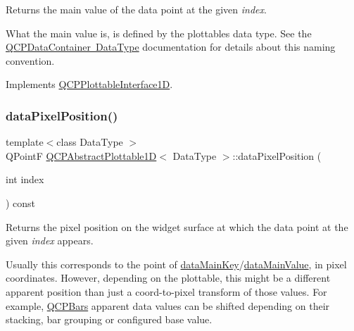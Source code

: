 Returns the main value of the data point at the given {\itshape index}.

What the main value is, is defined by the plottable\textquotesingle{}s data type. See the \mbox{\hyperlink{class_q_c_p_data_container_qcpdatacontainer-datatype}{Q\+C\+P\+Data\+Container Data\+Type}} documentation for details about this naming convention. 

Implements \mbox{\hyperlink{class_q_c_p_plottable_interface1_d_af6330919e8023277d08c958a6074fc76}{Q\+C\+P\+Plottable\+Interface1D}}.

\mbox{\label{class_q_c_p_abstract_plottable1_d_a14cf167457cda163575e6eec2a0b178d}} 
\subsubsection{\texorpdfstring{data\+Pixel\+Position()}{dataPixelPosition()}}
{\footnotesize\ttfamily template$<$class Data\+Type $>$ \\
Q\+PointF \mbox{\hyperlink{class_q_c_p_abstract_plottable1_d}{Q\+C\+P\+Abstract\+Plottable1D}}$<$ Data\+Type $>$\+::data\+Pixel\+Position (\begin{DoxyParamCaption}\item[{int}]{index }\end{DoxyParamCaption}) const\hspace{0.3cm}{\ttfamily [virtual]}}





Returns the pixel position on the widget surface at which the data point at the given {\itshape index} appears.

Usually this corresponds to the point of \mbox{\hyperlink{class_q_c_p_abstract_plottable1_d_ab14ab428595856bf76e04499017fa8dc}{data\+Main\+Key}}/\mbox{\hyperlink{class_q_c_p_abstract_plottable1_d_a0f913bb0889ca7cb574657a078fc8cff}{data\+Main\+Value}}, in pixel coordinates. However, depending on the plottable, this might be a different apparent position than just a coord-\/to-\/pixel transform of those values. For example, \mbox{\hyperlink{class_q_c_p_bars}{Q\+C\+P\+Bars}} apparent data values can be shifted depending on their stacking, bar grouping or configured base value. 

